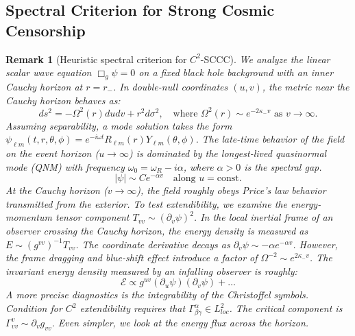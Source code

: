 \documentclass[12pt,a4paper]{article}
\newtheorem{remark}[theorem]{Remark}
\begin{document}
\subsection{Spectral Criterion for Strong Cosmic Censorship}
\begin{remark}[Heuristic spectral criterion for $C^2$-SCCC]
We analyze the linear scalar wave equation $\Box_g \psi = 0$ on a fixed black hole background with an inner Cauchy horizon at $r=r_-$. In double-null coordinates $(u,v)$, the metric near the Cauchy horizon behaves as:
\begin{equation}
ds^2 = -\Omega^2(r) du dv + r^2 d\sigma^2, \quad \text{where } \Omega^2(r) \sim e^{-2\kappa_- v} \text{ as } v \to \infty.
\end{equation}
Assuming separability, a mode solution takes the form $\psi_{\ell m}(t,r,\theta,\phi) = e^{-i\omega t} R_{\ell m}(r) Y_{\ell m}(\theta,\phi)$.
The late-time behavior of the field on the event horizon ($u \to \infty$) is dominated by the longest-lived quasinormal mode (QNM) with frequency $\omega_0 = \omega_R - i\alpha$, where $\alpha > 0$ is the spectral gap.
\begin{equation}
|\psi| \sim C e^{-\alpha v} \quad \text{along } u = \text{const}.
\end{equation}
At the Cauchy horizon ($v \to \infty$), the field roughly obeys Price's law behavior transmitted from the exterior.
To test extendibility, we examine the energy-momentum tensor component $T_{vv} \sim (\partial_v \psi)^2$. In the local inertial frame of an observer crossing the Cauchy horizon, the energy density is measured as $E \sim (g^{vv})^{-1} T_{vv}$.
The coordinate derivative decays as $\partial_v \psi \sim -\alpha e^{-\alpha v}$. 
However, the frame dragging and blue-shift effect introduce a factor of $\Omega^{-2} \sim e^{2\kappa_- v}$.
The invariant energy density measured by an infalling observer is roughly:
\begin{equation}
\mathcal{E} \propto g^{uv} (\partial_u \psi)(\partial_v \psi) + \dots
\end{equation}
A more precise diagnostics is the integrability of the Christoffel symbols. Condition for $C^2$ extendibility requires that $\Gamma^\alpha_{\beta\gamma} \in L^2_{loc}$. The critical component is $\Gamma^v_{vv} \sim \partial_v g_{vv}$. Even simpler, we look at the energy flux across the horizon.


\end{remark}
\end{document}
